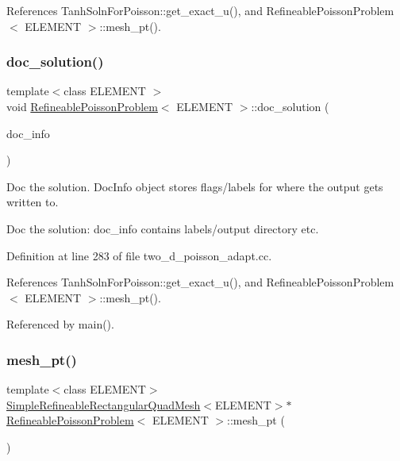 References Tanh\+Soln\+For\+Poisson\+::get\+\_\+exact\+\_\+u(), and Refineable\+Poisson\+Problem$<$ E\+L\+E\+M\+E\+N\+T $>$\+::mesh\+\_\+pt().

\mbox{\label{classRefineablePoissonProblem_aaf9482084473a6ca2bd0de24acae08e9}} 
\subsubsection{\texorpdfstring{doc\+\_\+solution()}{doc\_solution()}}
{\footnotesize\ttfamily template$<$class E\+L\+E\+M\+E\+NT $>$ \\
void \hyperlink{classRefineablePoissonProblem}{Refineable\+Poisson\+Problem}$<$ E\+L\+E\+M\+E\+NT $>$\+::doc\+\_\+solution (\begin{DoxyParamCaption}\item[{Doc\+Info \&}]{doc\+\_\+info }\end{DoxyParamCaption})}



Doc the solution. Doc\+Info object stores flags/labels for where the output gets written to. 

Doc the solution\+: doc\+\_\+info contains labels/output directory etc. 

Definition at line 283 of file two\+\_\+d\+\_\+poisson\+\_\+adapt.\+cc.



References Tanh\+Soln\+For\+Poisson\+::get\+\_\+exact\+\_\+u(), and Refineable\+Poisson\+Problem$<$ E\+L\+E\+M\+E\+N\+T $>$\+::mesh\+\_\+pt().



Referenced by main().

\mbox{\label{classRefineablePoissonProblem_ad8148aada59e279cbd9eb34272b65fa5}} 
\subsubsection{\texorpdfstring{mesh\+\_\+pt()}{mesh\_pt()}}
{\footnotesize\ttfamily template$<$class E\+L\+E\+M\+E\+NT$>$ \\
\hyperlink{classSimpleRefineableRectangularQuadMesh}{Simple\+Refineable\+Rectangular\+Quad\+Mesh}$<$E\+L\+E\+M\+E\+NT$>$$\ast$ \hyperlink{classRefineablePoissonProblem}{Refineable\+Poisson\+Problem}$<$ E\+L\+E\+M\+E\+NT $>$\+::mesh\+\_\+pt (\begin{DoxyParamCaption}{ }\end{DoxyParamCaption})\hspace{0.3cm}{\ttfamily [inline]}}




